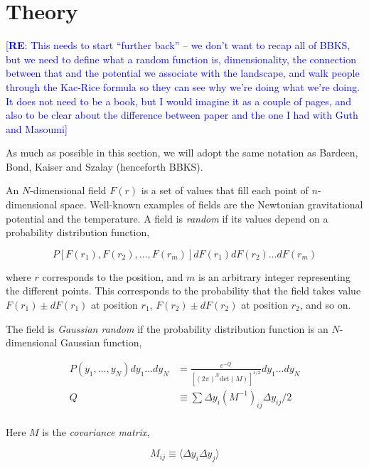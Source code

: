 \documentclass[12pt]{article}
\newcommand{\re}[1]{\textcolor{blue}{[{\bf RE}: #1]}}
\begin{document}
\section{Theory}

\re{This needs to start ``further back'' -- we don't want to recap all of BBKS, but we need to define what a random function is, dimensionality, the connection between that  and the potential we associate with the landscape, and walk people through the Kac-Rice formula so they can see why we're doing what we're doing. It does not need to be a book, but I would imagine it as a couple of pages, and also to be clear about the difference between paper and the one I had with Guth and Masoumi}

As much as possible in this section, we will adopt the same notation as Bardeen, Bond, Kaiser and Szalay (henceforth BBKS). \cite{BBKS}

An $N$-dimensional field $F(r)$ is a set of values that fill each point of $n$-dimensional space. Well-known examples of fields are the Newtonian gravitational potential and the temperature. A field is \emph{random} if its values depend on a probability distribution function,

\begin{equation}
P[F(r_1), F(r_2), \ldots, F(r_m)]dF(r_1)dF(r_2)\ldots dF(r_m)
\end{equation}

\noindent where $r$ corresponds to the position, and $m$ is an arbitrary integer representing the different points. This corresponds to the probability that the field takes value $F(r_1) \pm dF(r_1)$ at position $r_1$, $F(r_2) \pm dF(r_2)$ at position $r_2$, and so on. 

The field is \emph{Gaussian random} if the probability distribution function is an $N$-dimensional Gaussian function,

\begin{equation} \label{MultivariateGaussian}
\begin{split}
P(y_1,\ldots,y_N)dy_1\ldots dy_N &= \frac{e^{-Q}}{[(2\pi)^N \mathrm{det}(M)]^{1/2}} dy_1\ldots dy_N\\
Q &\equiv \sum \Delta y_i (M^{-1})_{ij} \Delta y_{ij} / 2 \\
\end{split}
\end{equation}

Here $M$ is the \emph{covariance matrix}, 

\begin{equation}
M_{ij} \equiv \langle \Delta y_i \Delta y_j \rangle
\end{equation}
\end{document}
